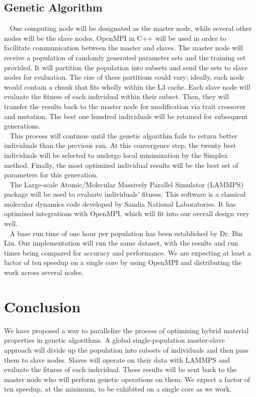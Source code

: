 \documentclass[letterpaper, 12pt]{article}
\begin{document}
\begin{flushleft}
\subsection*{Genetic Algorithm}

~\newline
One computing node will be designated as the master node, while several other nodes will be the slave nodes.  OpenMPI in C++ will be used in order to facilitate communication between the master and slaves. The master node will receive a population of randomly generated parameter sets and the training set provided.  It will partition the population into subsets and send the sets to slave nodes for evaluation.  The size of these partitions could vary; ideally, each node would contain a chunk that fits wholly within the L3 cache. Each slave node will evaluate the fitness of each individual within their subset. Then, they will transfer the results back to the  master node for modification via trait crossover and mutation. The best one hundred individuals will be retained for subsequent generations.\\
~\newline 
This process will continue until the genetic algorithm fails to return better individuals than the previous run.  At this convergence step, the twenty best individuals will be selected to undergo local minimization by the Simplex method.  Finally, the most optimized individual results will be the best set of parameters for this generation. \\
~\newline
The Large-scale Atomic/Molecular Massively Parallel Simulator (LAMMPS) package will be used to evaluate individuals' fitness.  This software is a classical molecular dynamics code developed by Sandia National Laboratories.  It has optimized integrations with OpenMPI, which will fit into our overall design very well. \\
~\newline 
A base run time of one hour per population has been established by Dr. Bin Liu.  Our implementation will run the same dataset, with the results and run times being compared for accuracy and performance.  We are expecting at least a factor of ten speedup on a single core by using OpenMPI and distributing the work across several nodes.




\newpage
\section*{Conclusion}
We have proposed a way to parallelize the process of optimizing hybrid material properties in genetic algorithms.  A global single-population master-slave approach will divide up the population into subsets of individuals and then pass them to slave nodes.  Slaves will operate on their data with LAMMPS and evaluate the fitness of each individual.  These results will be sent back to the master node who will perform genetic operations on them.  We expect a factor of ten speedup, at the minimum, to be exhibited on a single core as we work.


\end{flushleft}
\end{document}
